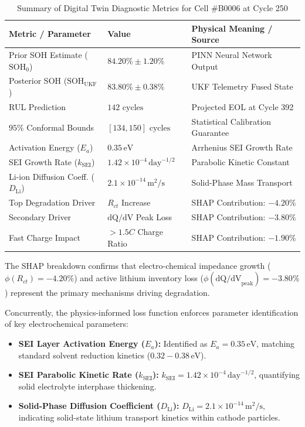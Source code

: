\begin{table}[htbp]
\centering
\caption{Summary of Digital Twin Diagnostic Metrics for Cell \#B0006 at Cycle 250}
\label{tab:case_study_summary}
\begin{tabular}{lll}
\toprule
\textbf{Metric / Parameter} & \textbf{Value} & \textbf{Physical Meaning / Source} \\
\midrule
Prior SOH Estimate ($\mathrm{SOH}_0$) & $84.20\% \pm 1.20\%$ & PINN Neural Network Output \\
Posterior SOH ($\mathrm{SOH}_{\mathrm{UKF}}$) & $83.80\% \pm 0.38\%$ & UKF Telemetry Fused State \\
RUL Prediction & $142 \text{ cycles}$ & Projected EOL at Cycle 392 \\
$95\%$ Conformal Bounds & $[134, 150] \text{ cycles}$ & Statistical Calibration Guarantee \\
\midrule
Activation Energy ($E_a$) & $0.35\,\mathrm{eV}$ & Arrhenius SEI Growth Rate \\
SEI Growth Rate ($k_{\text{SEI}}$) & $1.42 \times 10^{-4}\,\mathrm{day}^{-1/2}$ & Parabolic Kinetic Constant \\
Li-ion Diffusion Coeff. ($D_{\mathrm{Li}}$) & $2.1 \times 10^{-14}\,\mathrm{m}^2/\mathrm{s}$ & Solid-Phase Mass Transport \\
\midrule
Top Degradation Driver & $R_{ct}$ Increase & SHAP Contribution: $-4.20\%$ \\
Secondary Driver & $\mathrm{dQ/dV}$ Peak Loss & SHAP Contribution: $-3.80\%$ \\
Fast Charge Impact & $>1.5C$ Charge Ratio & SHAP Contribution: $-1.90\%$ \\
\bottomrule
\end{tabular}
\end{table}

The SHAP breakdown confirms that electro-chemical impedance growth ($\phi(R_{ct}) = -4.20\%$) and active lithium inventory loss ($\phi(\mathrm{dQ/dV}_{\mathrm{peak}}) = -3.80\%$) represent the primary mechanisms driving degradation.

Concurrently, the physics-informed loss function enforces parameter identification of key electrochemical parameters:
\begin{itemize}
    \item \textbf{SEI Layer Activation Energy ($E_a$):} Identified as $E_a = 0.35\,\mathrm{eV}$, matching standard solvent reduction kinetics ($0.32 - 0.38\,\mathrm{eV}$).
    \item \textbf{SEI Parabolic Kinetic Rate ($k_{\text{SEI}}$):} $k_{\text{SEI}} = 1.42 \times 10^{-4}\,\mathrm{day}^{-1/2}$, quantifying solid electrolyte interphase thickening.
    \item \textbf{Solid-Phase Diffusion Coefficient ($D_{\mathrm{Li}}$):} $D_{\mathrm{Li}} = 2.1 \times 10^{-14}\,\mathrm{m}^2/\mathrm{s}$, indicating solid-state lithium transport kinetics within cathode particles.
\end{itemize}

